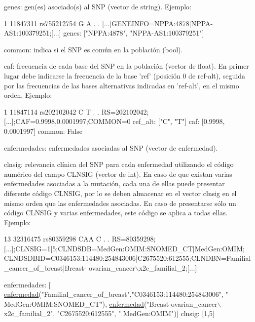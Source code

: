 \begin{DoxyItemize}
\item genes\-: gen(es) asociado(s) al S\-N\-P (vector de string). Ejemplo\-: 
\begin{DoxyCode}
1 11847311  rs755212754 G A . . [...]GENEINFO=NPPA:4878|NPPA-AS1:100379251;[...]
genes: [\textcolor{stringliteral}{"NPPA:4878"}, \textcolor{stringliteral}{"NPPA-AS1:100379251"}]
\end{DoxyCode}
 \item common\-: indica si el S\-N\-P es común en la población (bool). \item caf\-: frecuencia de cada base del S\-N\-P en la población (vector de float). En primer lugar debe indicarse la frecuencia de la base 'ref' (posición 0 de ref-\/alt), seguida por las frecuencias de las bases alternativas indicadas en 'ref-\/alt', en el mismo orden. Ejemplo\-: 
\begin{DoxyCode}
1 11847114  rs202102042 C T . . RS=202102042;[...];CAF=0.9998,0.0001997;COMMON=0
ref\_alt: [\textcolor{stringliteral}{"C"}, \textcolor{stringliteral}{"T"}]
caf: [0.9998, 0.0001997]
common: False
\end{DoxyCode}
 \item enfermedades\-: enfermedades asociadas al S\-N\-P (vector de enfermedad). \item clnsig\-: relevancia clínica del S\-N\-P para cada enfermedad utilizando el código numérico del campo C\-L\-N\-S\-I\-G (vector de int). En caso de que existan varias enfermedades asociadas a la mutación, cada una de ellas puede presentar diferente código C\-L\-N\-S\-I\-G, por lo se deben almacenar en el vector clnsig en el mismo orden que las enfermedades asociadas. En caso de presentarse sólo un código C\-L\-N\-S\-I\-G y varias enfermedades, este código se aplica a todas ellas. Ejemplo\-: 
\begin{DoxyCode}
13  32316475  rs80359298  CAA C . . RS=80359298;[...];CLNSIG=1|5;CLNDSDB=MedGen:OMIM:SNOMED\_CT|MedGen:OMIM;
      CLNDSDBID=C0346153:114480:254843006|C2675520:612555;CLNDBN=Familial\_cancer\_of\_breast|Breast-
      ovarian\_cancer\(\backslash\)x2c\_familial\_2;[...]

enfermedades: [ \hyperlink{classenfermedad}{enfermedad}(\textcolor{stringliteral}{"Familial\_cancer\_of\_breast"},\textcolor{stringliteral}{"C0346153:114480:254843006"}, \textcolor{stringliteral}{"
      MedGen:OMIM:SNOMED\_CT"}), 
                \hyperlink{classenfermedad}{enfermedad}(\textcolor{stringliteral}{"Breast-ovarian\_cancer\(\backslash\)x2c\_familial\_2"}, \textcolor{stringliteral}{"C2675520:612555"}, \textcolor{stringliteral}{"
      MedGen:OMIM"})]
clnsig: [1,5] 
\end{DoxyCode}
\end{DoxyItemize}

